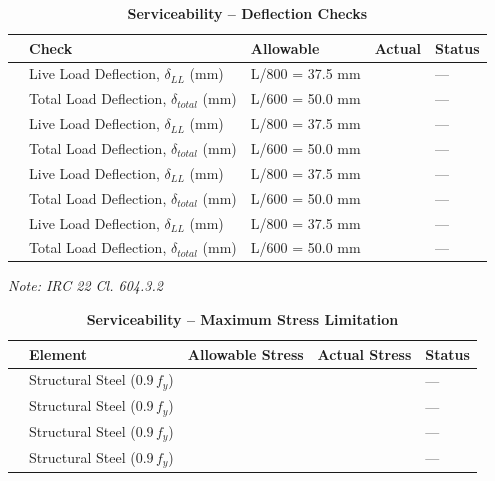 \documentclass[12pt,a4paper]{report}
\numberwithin{table}{chapter}
\numberwithin{figure}{chapter}
\begin{document}
\vspace{1em}
\begin{longtable}{|C{2.5cm}|L{3.5cm}|C{3.5cm}|>{\centering\arraybackslash}p{3.5cm}|C{2.5cm}|}
\caption{\textbf{Serviceability -- Deflection Checks}}
\hline
\textbf{} & \textbf{Check} & \textbf{Allowable} & \textbf{Actual} & \textbf{Status} \\[6pt]
\hline
{} & Live Load Deflection, $\delta_{LL}$ (mm) & L/800 = 37.5 mm &  & --- \\[6pt]
 & Total Load Deflection, $\delta_{total}$ (mm) & L/600 = 50.0 mm &  & --- \\[6pt]
\hline
{} & Live Load Deflection, $\delta_{LL}$ (mm) & L/800 = 37.5 mm &  & --- \\[6pt]
 & Total Load Deflection, $\delta_{total}$ (mm) & L/600 = 50.0 mm &  & --- \\[6pt]
\hline
{} & Live Load Deflection, $\delta_{LL}$ (mm) & L/800 = 37.5 mm &  & --- \\[6pt]
 & Total Load Deflection, $\delta_{total}$ (mm) & L/600 = 50.0 mm &  & --- \\[6pt]
\hline
{} & Live Load Deflection, $\delta_{LL}$ (mm) & L/800 = 37.5 mm &  & --- \\[6pt]
 & Total Load Deflection, $\delta_{total}$ (mm) & L/600 = 50.0 mm &  & --- \\[6pt]
\hline
\end{longtable}
\noindent\textit{Note: IRC 22 Cl. 604.3.2}

\vspace{1em}
\begin{longtable}{|C{2.5cm}|L{3.5cm}|C{3.5cm}|>{\centering\arraybackslash}p{3.5cm}|C{2.5cm}|}
\caption{\textbf{Serviceability -- Maximum Stress Limitation}}
\hline
\textbf{} & \textbf{Element} & \textbf{Allowable Stress} & \textbf{Actual Stress} & \textbf{Status} \\[6pt]
\hline
{} & Structural Steel ($0.9\,f_y$) &  &  & --- \\[6pt]
\hline
{} & Structural Steel ($0.9\,f_y$) &  &  & --- \\[6pt]
\hline
{} & Structural Steel ($0.9\,f_y$) &  &  & --- \\[6pt]
\hline
{} & Structural Steel ($0.9\,f_y$) &  &  & --- \\[6pt]
\hline
\end{longtable}
\end{document}
